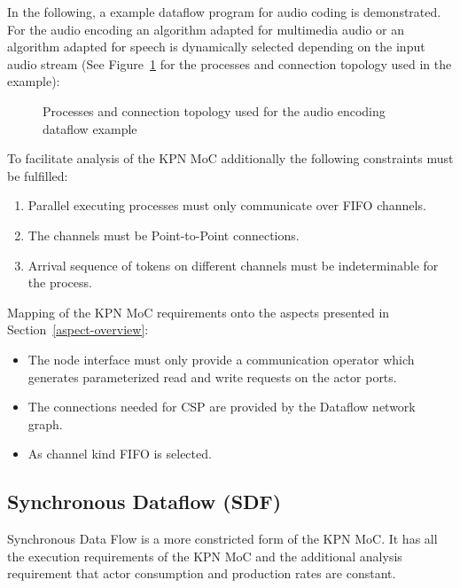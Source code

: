 In the following, a example dataflow program for audio coding
is demonstrated. For the audio encoding an algorithm
adapted for multimedia audio or an algorithm adapted for speech
is dynamically selected depending on the input audio stream
(See Figure~\ref{fig:media-speech-audio-coding}
for the processes and connection topology used in the example):

\begin{figure}[h]
\centering

\caption{Processes and connection topology used for the audio encoding dataflow example}
\label{fig:media-speech-audio-coding}
\end{figure}



To facilitate analysis of the KPN MoC additionally the following
constraints must be fulfilled:
\begin{enumerate}
\item Parallel executing processes must only communicate over FIFO channels.
\item The channels must be Point-to-Point connections.
\item Arrival sequence of tokens on different channels must be indeterminable
      for the process.
\end{enumerate}

Mapping of the KPN MoC requirements onto the aspects presented in
Section~\ref{aspect-overview}:

\begin{itemize}

\item The node interface must only provide a communication operator which
      generates parameterized read and write requests on the actor ports.

\item The connections needed for CSP are provided by the Dataflow network graph.

\item As channel kind FIFO is selected.

\end{itemize}

\subsection{Synchronous Dataflow (SDF)}
Synchronous Data Flow \cite{Lee87b:1987}
is a more constricted form of the KPN MoC.
It has all the execution requirements of the KPN MoC and
the additional analysis requirement that actor consumption and
production rates are constant.

